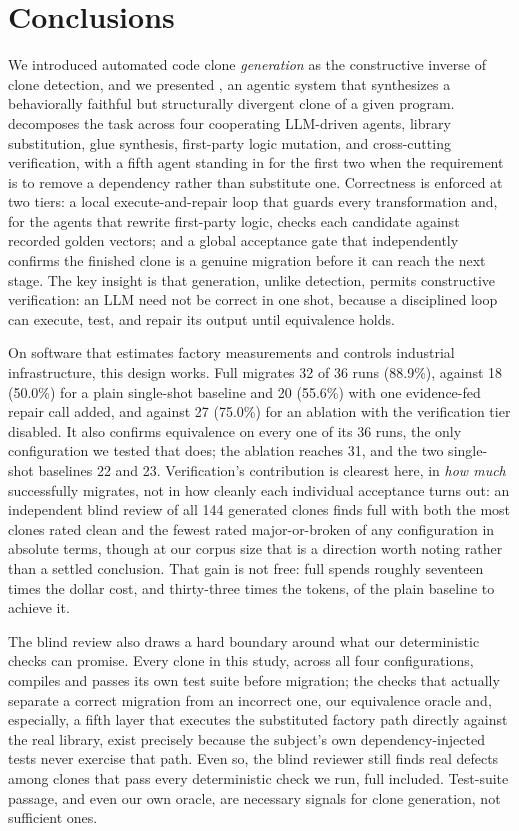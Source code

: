 \section{Conclusions}
\label{sec:conclusions}

We introduced automated code clone \emph{generation} as the constructive inverse of clone detection, and we presented \sys, an agentic system that synthesizes a behaviorally faithful but structurally divergent clone of a given program. \sys decomposes the task across four cooperating LLM-driven agents, library substitution, glue synthesis, first-party logic mutation, and cross-cutting verification, with a fifth agent standing in for the first two when the requirement is to remove a dependency rather than substitute one. Correctness is enforced at two tiers: a local execute-and-repair loop that guards every transformation and, for the agents that rewrite first-party logic, checks each candidate against recorded golden vectors; and a global acceptance gate that independently confirms the finished clone is a genuine migration before it can reach the next stage. The key insight is that generation, unlike detection, permits constructive verification: an LLM need not be correct in one shot, because a disciplined loop can execute, test, and repair its output until equivalence holds.

On software that estimates factory measurements and controls industrial infrastructure, this design works. Full \sys migrates 32 of 36 runs (88.9\%), against 18 (50.0\%) for a plain single-shot baseline and 20 (55.6\%) with one evidence-fed repair call added, and against 27 (75.0\%) for an ablation with the verification tier disabled. It also confirms equivalence on every one of its 36 runs, the only configuration we tested that does; the ablation reaches 31, and the two single-shot baselines 22 and 23. Verification's contribution is clearest here, in \emph{how much} \sys successfully migrates, not in how cleanly each individual acceptance turns out: an independent blind review of all 144 generated clones finds full \sys with both the most clones rated clean and the fewest rated major-or-broken of any configuration in absolute terms, though at our corpus size that is a direction worth noting rather than a settled conclusion. That gain is not free: full \sys spends roughly seventeen times the dollar cost, and thirty-three times the tokens, of the plain baseline to achieve it.

The blind review also draws a hard boundary around what our deterministic checks can promise. Every clone in this study, across all four configurations, compiles and passes its own test suite before migration; the checks that actually separate a correct migration from an incorrect one, our equivalence oracle and, especially, a fifth layer that executes the substituted factory path directly against the real library, exist precisely because the subject's own dependency-injected tests never exercise that path. Even so, the blind reviewer still finds real defects among clones that pass every deterministic check we run, full \sys included. Test-suite passage, and even our own oracle, are necessary signals for clone generation, not sufficient ones.

